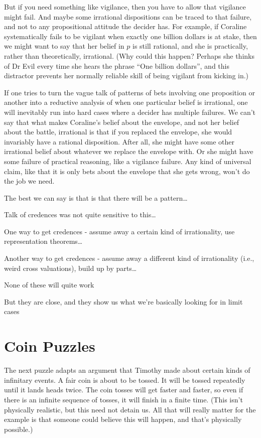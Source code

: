 \documentclass[11pt,]{book}
\begin{document}
But if you need something like vigilance, then you have to allow that vigilance might fail. And maybe some irrational dispositions can be traced to that failure, and not to any propositional attitude the decider has. For example, if Coraline systematically fails to be vigilant when exactly one billion dollars is at stake, then we might want to say that her belief in \(p\) is still rational, and she is practically, rather than theoretically, irrational. (Why could this happen? Perhaps she thinks of Dr Evil every time she hears the phrase ``One billion dollars'', and this distractor prevents her normally reliable skill of being vigilant from kicking in.)

If one tries to turn the vague talk of patterns of bets involving one proposition or another into a reductive analysis of when one particular belief is irrational, one will inevitably run into hard cases where a decider has multiple failures. We can't say that what makes Coraline's belief about the envelope, and not her belief about the battle, irrational is that if you replaced the envelope, she would invariably have a rational disposition. After all, she might have some other irrational belief about whatever we replace the envelope with. Or she might have some failure of practical reasoning, like a vigilance failure. Any kind of universal claim, like that it is only bets about the envelope that she gets wrong, won't do the job we need.

The best we can say is that is that there will be a pattern\ldots{}

Talk of credences was not quite sensitive to this\ldots{}

One way to get credences - assume away a certain kind of irrationality, use representation theorems\ldots{}

Another way to get credences - assume away a different kind of irrationality (i.e., weird cross valuations), build up by parts\ldots{}

None of these will quite work

But they are close, and they show us what we're basically looking for in limit cases

\hypertarget{lockecoin}{%
\section{Coin Puzzles}\label{lockecoin}}

The next puzzle adapts an argument that Timothy \citet{Williamson2007} made about certain kinds of infinitary events. A fair coin is about to be tossed. It will be tossed repeatedly until it lands heads twice. The coin tosses will get faster and faster, so even if there is an infinite sequence of tosses, it will finish in a finite time. (This isn't physically realistic, but this need not detain us. All that will really matter for the example is that someone could believe this will happen, and that's physically possible.)
\end{document}
